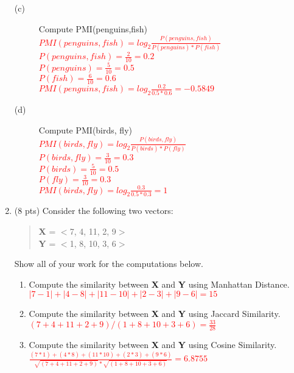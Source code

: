 \documentclass[11pt]{article}
\begin{document}
\begin{enumerate}
\begin{description}
\item[(c)] Compute PMI(penguins,fish)\\
\textcolor{red}{ 
$PMI(penguins,fish) = log_2{\frac{P(penguins,fish)}{P(penguins)*P(fish)}}$\\
$P(penguins,fish) = \frac{2}{10}= 0.2$\\
$P(penguins)= \frac{5}{10}= 0.5$\\
$P(fish)= \frac{6}{10}= 0.6$\\
$PMI(penguins,fish) = log_2{\frac{0.2}{0.5*0.6}}= -0.5849$ \\ }

\item[(d)] Compute PMI(birds, fly)\\
\textcolor{red}{ 
$PMI(birds,fly) = log_2{\frac{P(birds,fly)}{P(birds)*P(fly)}}$\\
$P(birds,fly) = \frac{3}{10}= 0.3$\\
$P(birds)= \frac{5}{10}= 0.5$\\
$P(fly)= \frac{3}{10}= 0.3$\\
$PMI(birds,fly) = log_2{\frac{0.3}{0.5*0.3}}= 1$ \\ }
\end{description}
 

\newpage

\item (8 pts) Consider the following two  vectors:
\begin{quote}
{\bf X} = $<$7, 4, 11, 2, 9$>$ \\
{\bf Y} = $<$1, 8, 10, 3, 6$>$ 
\end{quote}

\vspace*{.2in}
Show all of your work for the computations below. 

\begin{enumerate}
\item Compute the similarity between {\bf X} and {\bf Y} using
  Manhattan Distance. \\
  \textcolor{red}{$ |7-1|+|4-8|+|11-10|+|2-3|+|9-6|=15$}


\item Compute the similarity between {\bf X} and {\bf Y} using Jaccard
  Similarity.\\
\textcolor{red}{$ (7+4+11+2+9)/(1+8+10+3+6)= \frac{33}{28}$}

\item Compute the similarity between {\bf X} and {\bf Y} using Cosine
  Similarity.\\
\textcolor{red}{$\frac{(7*1)+(4*8)+(11*10)+(2*3)+(9*6)}{\sqrt{(7+4+11+2+9)}*\sqrt{(1+8+10+3+6)}}= 6.8755$}



\end{enumerate}
\end{enumerate}
\end{document}
